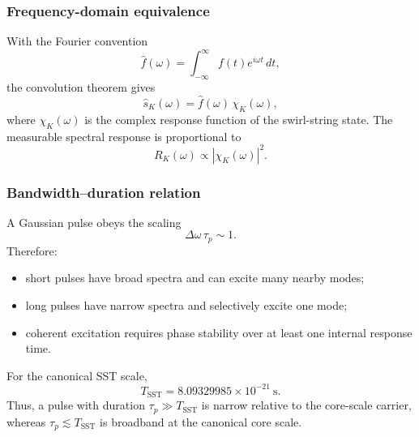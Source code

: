     \subsubsection*{Frequency-domain equivalence}
        
        With the Fourier convention
        \[
            \hat f(\omega)
            =
            \int_{-\infty}^{\infty}
            f(t)e^{i\omega t}\,dt,
        \]
        the convolution theorem gives
        \begin{equation}
            \hat s_K(\omega)
            =
            \hat f(\omega)\,\chi_K(\omega),
            \label{eq:frequency_response_chi}
        \end{equation}
        where \(\chi_K(\omega)\) is the complex response function of the swirl-string state. The measurable spectral response is proportional to
        \begin{equation}
            R_K(\omega)
            \propto
            |\chi_K(\omega)|^2.
            \label{eq:response_modulus}
        \end{equation}
    
    \subsubsection*{Bandwidth--duration relation}
        
        A Gaussian pulse obeys the scaling
        \begin{equation}
            \Delta\omega\,\tau_p \sim 1.
            \label{eq:time_bandwidth_relation}
        \end{equation}
        Therefore:
        \begin{itemize}
            \item short pulses have broad spectra and can excite many nearby modes;
            \item long pulses have narrow spectra and selectively excite one mode;
            \item coherent excitation requires phase stability over at least one internal response time.
        \end{itemize}
        
        For the canonical SST scale,
        \[
            T_{\mathrm{SST}} = 8.09329985\times10^{-21}\ \mathrm{s}.
        \]
        Thus, a pulse with duration \(\tau_p\gg T_{\mathrm{SST}}\) is narrow relative to the core-scale carrier, whereas \(\tau_p\lesssim T_{\mathrm{SST}}\) is broadband at the canonical core scale.
    
